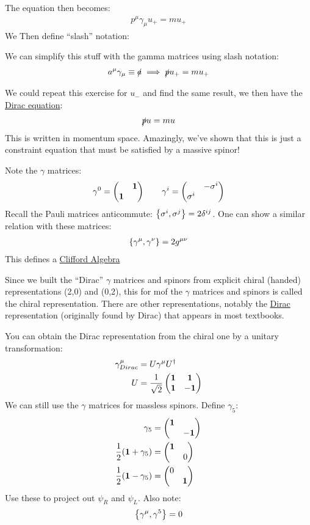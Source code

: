 The equation then becomes:
\begin{align*}
  p^\mu\gamma_\mu u_+=m u_+
\end{align*}
We Then define ``slash'' notation:
\begin{definition}
  We can simplify this stuff with the gamma matrices using slash notation:
  \begin{align*}
    a^\mu\gamma_\mu\equiv \slashed{a}\implies
    \slashed{p}u_+=mu_+
  \end{align*}
\end{definition}
We could repeat this exercise for $u_-$ and find the same result, we then have the \underline{Dirac equation}:
\begin{align*}
  \slashed{p}u=mu
\end{align*}
This is written in momentum space. Amazingly, we've shown that this is just a constraint equation that must be satisfied by a massive spinor!

\begin{aside}
  Note the $\gamma$ matrices:
  \begin{align*}
    \gamma^0=\pmqty{&\bm1\\\bm{1}}\qquad
    \gamma^i=\pmqty{&-\sigma^i\\\sigma^i}
  \end{align*}
  Recall the Pauli matrices anticommute: $\acomm{\sigma^i}{\sigma^j}=2\delta^{ij}$. One can show a similar relation with these matrices:
  \begin{align*}
    \acomm{\gamma^\mu}{\gamma^\nu}=2g^{\mu\nu}
  \end{align*}
  This defines a \underline{Clifford Algebra}
\end{aside}

Since we built the ``Dirac'' $\gamma$ matrices and spinors from explicit chiral (handed) representations (2,0) and (0,2), this for mof the $\gamma$ matrices and spinors is called the chiral representation. There are other representations, notably the \underline{Dirac} representation (originally found by Dirac) that appears in most textbooks.

You can obtain the Dirac representation from the chiral one by a unitary transformation:
\begin{align*}
  \gamma^\mu_{Dirac}&=U\gamma^\mu U^\dag\\
  U&=\frac1{\sqrt{2}}\pmqty{\bm{1}&\bm{1}\\\bm{1}&-\bm{1}}
\end{align*}
We can still use the $\gamma$ matrices for massless spinors. Define $\gamma_5$:
\begin{align*}
  \gamma_5&=\pmqty{\bm{1}\\&-\bm{1}}\\
  \frac12\qty(\bm{1}+\gamma_5)&=\pmqty{\bm{1}\\&0}\\
  \frac12\qty(\bm{1}-\gamma_5)&=\pmqty{0\\&\bm{1}}
\end{align*}
Use these to project out $\psi_R$ and $\psi_L$. Also note:
\begin{align*}
  \acomm{\gamma^\mu}{\gamma^5}=0
\end{align*}

